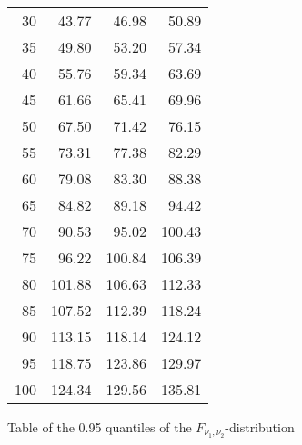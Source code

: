\documentclass{article}
\begin{document}
\begin{minipage}[t]{6cm}
\begin{center}
\begin{tabular}{|r|rrr|}
				30 & 43.77 & 46.98 & 50.89 \\
				35 & 49.80 & 53.20 & 57.34 \\
				40 & 55.76 & 59.34 & 63.69 \\
				45 & 61.66 & 65.41 & 69.96 \\
				50 & 67.50 & 71.42 & 76.15 \\
				55 & 73.31 & 77.38 & 82.29 \\
				60 & 79.08 & 83.30 & 88.38 \\
				65 & 84.82 & 89.18 & 94.42 \\
				70 & 90.53 & 95.02 & 100.43 \\
				75 & 96.22 & 100.84 & 106.39 \\
				80 & 101.88 & 106.63 & 112.33 \\
				85 & 107.52 & 112.39 & 118.24 \\
				90 & 113.15 & 118.14 & 124.12 \\
				95 & 118.75 & 123.86 & 129.97 \\
				100 & 124.34 & 129.56 & 135.81 \\ \hline
			\end{tabular}
		\end{center}
	\end{minipage}\newpage Table of the  0.95 quantiles of the $F_{\nu _{1},\nu _{2}}$-distribution
	
\end{document}
